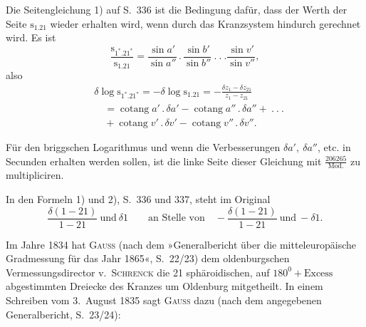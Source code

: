 \par\noindent\hspace*{\parindent}Die Seitengleichung 1) auf S.~336 ist die Bedingung dafür, dass der Werth der Seite \(\mathrm{s}_{1.21}\) wieder erhalten wird, wenn durch das Kranzsystem hindurch gerechnet wird. Es ist
\[
\frac{\mathrm{s}_{1^*.21^*}}{\mathrm{s}_{1.21}}=\frac{\sin a'}{\sin a''}\,.\,\frac{\sin b'}{\sin b''}\ .\ .\ .\frac{\sin v'}{\sin v''},
\]
\noindent also
\[
\begin{aligned}
&\delta\log\mathrm{s}_{1^*.21^*}=-\delta\log\mathrm{s}_{1.21}=-\frac{\delta z_1-\delta z_{21}}{z_1-z_{21}}\\
&\quad=\operatorname{cotang}a'\,.\,\delta a'-\operatorname{cotang}a''\,.\,\delta a''+\ .\ .\ .\\
&\quad+\operatorname{cotang}v'\,.\,\delta v'-\operatorname{cotang}v''\,.\,\delta v''.
\end{aligned}
\]
\par\noindent\hspace*{\parindent}Für den briggschen Logarithmus und wenn die Verbesserungen \(\delta a',\ \delta a''\), etc. in Secunden erhalten werden sollen, ist die linke Seite dieser Gleichung mit \(\frac{206265}{\mathrm{Mod.}}\) zu multipliciren.

\par\noindent\hspace*{\parindent}In den Formeln 1) und 2), S.~336 und 337, steht im Original
\[
\frac{\delta(1-21)}{1-21}\ \text{und}\ \delta1\qquad\text{an Stelle von}\quad-\frac{\delta(1-21)}{1-21}\ \text{und}\ -\delta1.
\]
\par\noindent\hspace*{\parindent}Im Jahre 1834 hat \textsc{Gauss} (nach dem »Generalbericht über die mitteleuropäische Gradmessung für das Jahr 1865«, S.~22/23) dem oldenburgschen Vermessungsdirector v.~\textsc{Schrenck} die 21 sphäroidischen, auf \(180^0+\text{Excess}\) abgestimmten Dreiecke des Kranzes um Oldenburg mitgetheilt. In einem Schreiben vom 3.~August 1835 sagt \textsc{Gauss} dazu (nach dem angegebenen Generalbericht, S.~23/24):

